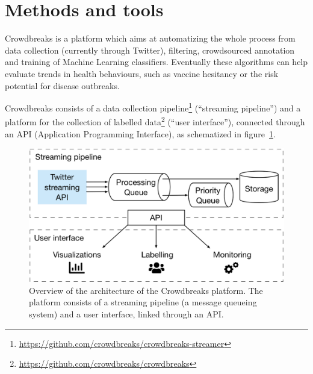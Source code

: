 \documentclass[a4paper, 11pt]{article}
\begin{document}
\section{Methods and tools}
Crowdbreaks is a platform which aims at automatizing the whole process from data collection (currently through Twitter), filtering, crowdsourced annotation and training of Machine Learning classifiers. 
Eventually these algorithms can help evaluate trends in health behaviours, such as vaccine hesitancy or the risk potential for disease outbreaks.\par
Crowdbreaks consists of a data collection pipeline\footnote{\url{https://github.com/crowdbreaks/crowdbreaks-streamer}} (``streaming pipeline'') and a platform for the collection of labelled data\footnote{\url{https://github.com/crowdbreaks/crowdbreaks}} (``user interface''), connected through an API (Application Programming Interface), as schematized in figure~\ref{fig:fig1}.

\begin{figure}[!ht]
\centering
\includegraphics{figures/fig1.png}
  \caption{Overview of the architecture of the Crowdbreaks platform. The platform consists of a streaming pipeline (a message queueing system) and a user interface, linked through an API.}
  \label{fig:fig1}
\end{figure}
\end{document}
